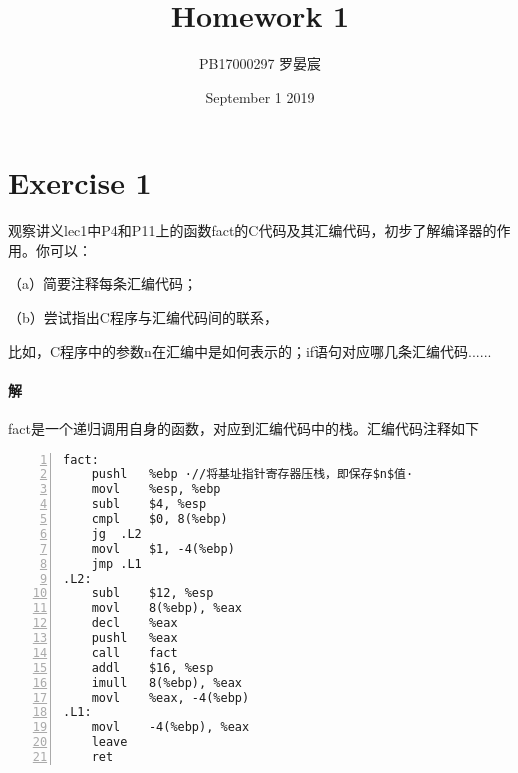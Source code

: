 \documentclass{article}
\title{Homework 1}
\author{PB17000297 罗晏宸}
\date{September 1 2019}
\begin{document}
\maketitle

\section{Exercise 1}
观察讲义lec1中P4和P11上的函数fact的C代码及其汇编代码，初步了解编译器的作用。你可以：\par
（a）简要注释每条汇编代码；\par
（b）尝试指出C程序与汇编代码间的联系，\par
比如，C程序中的参数n在汇编中是如何表示的；if语句对应哪几条汇编代码......
\\

\paragraph{解}
fact是一个递归调用自身的函数，对应到汇编代码中的栈。汇编代码注释如下
\begin{lstlisting}[language={[x86masm]Assembler},numbers=left, 
         numberstyle=\tiny,keywordstyle=\color{blue!70},escapeinside=··,frame=shadowbox,
         rulesepcolor=\color{red!20!green!20!blue!20},basicstyle=\ttfamily]
fact:
	pushl	%ebp ·//将基址指针寄存器压栈，即保存$n$值·
	movl	%esp, %ebp
	subl	$4, %esp
	cmpl	$0, 8(%ebp)
	jg	.L2
	movl	$1, -4(%ebp)
	jmp	.L1
.L2:
	subl	$12, %esp
	movl	8(%ebp), %eax
	decl	%eax
	pushl	%eax
	call	fact
	addl	$16, %esp
	imull	8(%ebp), %eax
	movl	%eax, -4(%ebp)
.L1:
	movl	-4(%ebp), %eax
	leave
	ret

\end{lstlisting}
\end{document}
